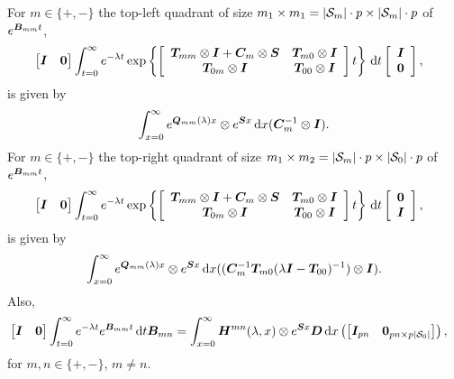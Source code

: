 \begin{cor}\label{cor: mpr B}
	For \(m\in\{+,-\}\) the top-left quadrant of size \(m_1\times m_1=|\mathcal{S}_m|\cdot p \times |\mathcal{S}_m|\cdot p\) of \(e^{\boldsymbol B_{mm}t}\), 
	\begin{align}
		&\begin{bmatrix} \boldsymbol I & \boldsymbol 0 \end{bmatrix}\int_{t=0}^\infty e^{-\lambda t} \exp\left\{\left[\begin{array}{cc} \boldsymbol T_{mm}\otimes \boldsymbol I + \boldsymbol C_m\otimes \boldsymbol S & \boldsymbol T_{m0}\otimes \boldsymbol I \\ \boldsymbol T_{0m} \otimes \boldsymbol I & \boldsymbol T_{00}\otimes \boldsymbol I \end{array}\right]t\right\} \, \mathrm{d} t\left[\begin{array}{c} \boldsymbol I \\ \boldsymbol 0 \end{array}\right], \nonumber
	\end{align}
	is given by 
	\begin{align}
		\int_{x=0}^\infty e^{\boldsymbol Q_{mm} (\lambda)x}\otimes  e^{\boldsymbol S x}\, \mathrm{d} x(\boldsymbol C_m^{-1}\otimes \boldsymbol I).\label{eqn: skagh87} 
	\end{align}
	For \(m\in\{+,-\}\) the top-right quadrant of size \(m_1\times m_2=|\mathcal{S}_m|\cdot p\times |\mathcal{S}_0|\cdot p\) of  \(e^{\boldsymbol B_{mm}t}\), 
	\begin{align}
		&\begin{bmatrix} \boldsymbol I & \boldsymbol 0 \end{bmatrix}\int_{t=0}^\infty e^{-\lambda t} \exp\left\{\left[\begin{array}{cc} \boldsymbol T_{mm}\otimes \boldsymbol I + \boldsymbol C_m\otimes \boldsymbol S & \boldsymbol T_{m0}\otimes \boldsymbol I \\ \boldsymbol T_{0m} \otimes \boldsymbol I & \boldsymbol T_{00}\otimes \boldsymbol I \end{array}\right]t\right\} \, \mathrm{d} t \left[\begin{array}{c}\boldsymbol 0 \\ \boldsymbol I\end{array}\right] ,\nonumber
	\end{align}
	is given by
	\begin{align}
		\int_{x=0}^\infty e^{\boldsymbol Q_{mm}(\lambda)x}\otimes  e^{\boldsymbol S x}\, \mathrm{d} x((\boldsymbol C_m^{-1}\boldsymbol T_{m0}(\lambda \boldsymbol I - \boldsymbol T_{00})^{-1})\otimes \boldsymbol I).\label{eqn: skagh873} 
	\end{align}
	Also, 
	\begin{align}
		&\vligne{\bs I & \bs 0 }\int_{t=0}^\infty e^{-\lambda t} e^{\bs{B}_{mm}t} \wrt t \bs{B}_{m{n}} %
	= \int_{x=0}^\infty \bs H^{mn}(\lambda,x)  \otimes  e^{\bs S x}\bs D\wrt x\left(\vligne{\bs I_{pn} & \bs 0_{pn\times p|\calS_0|}}\right), \label{eqn: akgj987adKLDJ}
\end{align}
for \(m,n\in\{+,-\}\), \(m\neq n\).
\end{cor}
